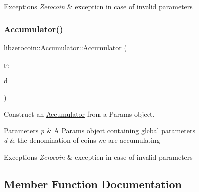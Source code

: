 \begin{DoxyExceptions}{Exceptions}
{\em Zerocoin} & exception in case of invalid parameters \\
\hline
\end{DoxyExceptions}
\mbox{\label{classlibzerocoin_1_1_accumulator_ab50daca64cafc7b8e304e173b4988a29}} 
\subsubsection{\texorpdfstring{Accumulator()}{Accumulator()}\hspace{0.1cm}{\footnotesize\ttfamily [2/2]}}
{\footnotesize\ttfamily libzerocoin\+::\+Accumulator\+::\+Accumulator (\begin{DoxyParamCaption}\item[{const \mbox{\hyperlink{classlibzerocoin_1_1_accumulator_and_proof_params}{Accumulator\+And\+Proof\+Params}} $\ast$}]{p,  }\item[{const Coin\+Denomination}]{d }\end{DoxyParamCaption})}



Construct an \mbox{\hyperlink{classlibzerocoin_1_1_accumulator}{Accumulator}} from a Params object. 


\begin{DoxyParams}{Parameters}
{\em p} & A Params object containing global parameters \\
\hline
{\em d} & the denomination of coins we are accumulating \\
\hline
\end{DoxyParams}

\begin{DoxyExceptions}{Exceptions}
{\em Zerocoin} & exception in case of invalid parameters \\
\hline
\end{DoxyExceptions}


\subsection{Member Function Documentation}
\mbox{\label{classlibzerocoin_1_1_accumulator_aa58ff4676bd84dea150ae40abd489024}} 
